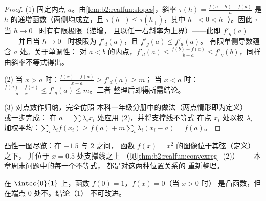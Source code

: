 \begin{proof}
(1) 固定内点 $a$。由\cref{lem:b2:realfun:slopes}，斜率
$\tau(h) = \frac{f(a + h) - f(a)}{h}$ 是
$h$ 的递增函数（两侧均成立，且 $\tau(h_-) \leq \tau(h_+)$，其中 $h_- < 0 <
h_+$）。因此 $\tau$ 当 $h \to 0^-$ 时有有限极限（递增，
且以任一右斜率为上界）——此即 $f'_g(a)$——并且当
$h \to 0^+$ 时极限为 $f'_d(a)$，且 $f'_g(a) \leq f'_d(a)$。
有限单侧导数蕴含 $a$ 处。关于单调性：
对 $a < b$ 的内点，$f'_d(a) \leq \frac{f(b) - f(a)}{b -
a} \leq f'_g(b)$，同样由斜率不等式得出。

(2) 当 $x > a$ 时：$\frac{f(x) - f(a)}{x - a} \geq f'_d(a) \geq m$；
当 $x < a$ 时：$\frac{f(a) - f(x)}{a - x} \leq f'_g(a) \leq m$。二者
整理后即得所需结论。

(3) 对点数作归纳，完全仿照
本科一年级分册中的做法（两点情形即为定义）——或一步完成：
在 $a = \sum\lambda_i x_i$ 处应用 (2)，并将支撑线不等式
在点 $x_i$ 处以权 $\lambda_i$ 加权平均：$\sum_i
\lambda_i f(x_i) \geq f(a) + m\sum_i\lambda_i(x_i - a) = f(a)$。
\end{proof}

\begin{omfigure}

{\small 凸性一图尽览：在 $-1.5$ 与 $2$ 之间，
函数 $f(x) = x^2$ 的图像位于其弦（定义）之下，
并位于 $x = 0.5$ 处支撑线之上
（见\cref{thm:b2:realfun:convexreg}~(2)）——本章周末问题中的每一个不等式，
都是对这两种位置关系的
重新整理。}
\end{omfigure}

\begin{example}[端点处的不连续]
在 $\intcc{0}{1}$ 上，函数 $f(0) = 1$，$f(x) = 0$（当 $x > 0$ 时）
是凸函数，但在端点 $0$ 处不。结论（1）
不可改进。
\end{example}

